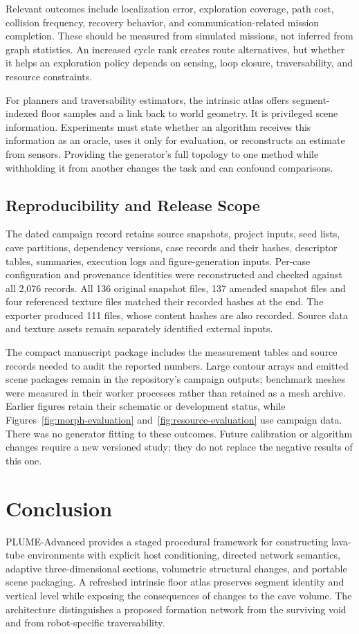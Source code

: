 \documentclass[conference]{IEEEtran}
\begin{document}
Relevant outcomes include localization error, exploration coverage, path cost, collision frequency, recovery behavior, and communication-related mission completion. These should be measured from simulated missions, not inferred from graph statistics. An increased cycle rank creates route alternatives, but whether it helps an exploration policy depends on sensing, loop closure, traversability, and resource constraints.

For planners and traversability estimators, the intrinsic atlas offers segment-indexed floor samples and a link back to world geometry. It is privileged scene information. Experiments must state whether an algorithm receives this information as an oracle, uses it only for evaluation, or reconstructs an estimate from sensors. Providing the generator's full topology to one method while withholding it from another changes the task and can confound comparisons.

\subsection{Reproducibility and Release Scope}
The dated campaign record retains source snapshots, project inputs, seed lists, cave partitions, dependency versions, case records and their hashes, descriptor tables, summaries, execution logs and figure-generation inputs. Per-case configuration and provenance identities were reconstructed and checked against all 2,076 records. All 136 original snapshot files, 137 amended snapshot files and four referenced texture files matched their recorded hashes at the end. The exporter produced 111 files, whose content hashes are also recorded. Source data and texture assets remain separately identified external inputs.

The compact manuscript package includes the measurement tables and source records needed to audit the reported numbers. Large contour arrays and emitted scene packages remain in the repository's campaign outputs; benchmark meshes were measured in their worker processes rather than retained as a mesh archive. Earlier figures retain their schematic or development status, while Figures~\ref{fig:morph-evaluation} and~\ref{fig:resource-evaluation} use campaign data. There was no generator fitting to these outcomes. Future calibration or algorithm changes require a new versioned study; they do not replace the negative results of this one.

\section{Conclusion}
PLUME-Advanced provides a staged procedural framework for constructing lava-tube environments with explicit host conditioning, directed network semantics, adaptive three-dimensional sections, volumetric structural changes, and portable scene packaging. A refreshed intrinsic floor atlas preserves segment identity and vertical level while exposing the consequences of changes to the cave volume. The architecture distinguishes a proposed formation network from the surviving void and from robot-specific traversability.
\end{document}
